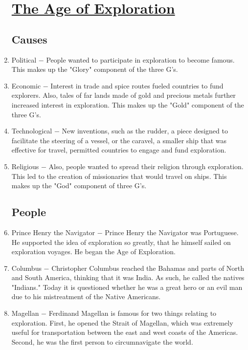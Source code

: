 \documentclass[12pt]{article}
\begin{document}
\begin{enumerate}
\begin{center}
\section{\underline{The Age of Exploration}}
\end{center}

\subsection{Causes}

\item Political $-$ People wanted to participate in exploration to become famous. This makes up the "Glory" component of the three G's.   

\item Economic $-$ Interest in trade and spice routes fueled countries to fund explorers. Also, tales of far lands made of gold and precious metals further increased interest in exploration. This makes up the "Gold" component of the three G's.

\item Technological $-$ New inventions, such as the rudder, a piece designed to facilitate the steering of a vessel, or the caravel, a smaller ship that was effective for travel, permitted countries to engage and fund exploration.

\item Religious $-$ Also, people wanted to spread their religion through exploration. This led to the creation of missionaries that would travel on ships. This makes up the "God" component of three G's.

\subsection{People}

\item Prince Henry the Navigator $-$ Prince Henry the Navigator was Portuguese. He supported the idea of exploration so greatly, that he himself sailed on exploration voyages. He began the Age of Exploration. 

\item Columbus $-$ Christopher Columbus reached the Bahamas and parts of North and South America, thinking that it was India. As such, he called the natives "Indians." Today it is questioned whether he was a great hero or an evil man due to his mistreatment of the Native Americans.

\item Magellan $-$ Ferdinand Magellan is famous for two things relating to exploration. First, he opened the Strait of Magellan, which was extremely useful for transportation between the east and west coasts of the Americas. Second, he was the first person to circumnavigate the world. 


\end{enumerate}
\end{document}
